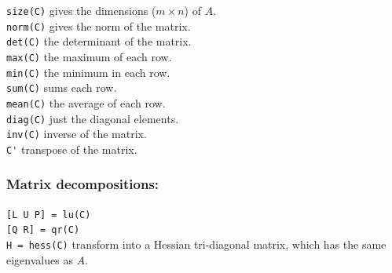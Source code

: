 \verb&size(C)& \dotfill gives the dimensions ($m \times n$) of $A$.\\
\verb&norm(C)& \dotfill gives the norm of the matrix.\\
\verb&det(C)&   \dotfill the determinant of the matrix.\\
\verb&max(C)&   \dotfill the maximum of each row.\\
\verb&min(C)&   \dotfill the minimum in each row.\\
\verb&sum(C)&   \dotfill sums each row.\\
\verb&mean(C)&   \dotfill the average of each row.\\
\verb&diag(C)&   \dotfill just the diagonal elements. \\
\verb&inv(C)&    \dotfill inverse of the matrix.\\
\verb&C'&    \dotfill transpose of the matrix.

\subsubsection*{Matrix decompositions:}

\verb&[L U P] = lu(C)&\\
\verb&[Q R] = qr(C)&\\
\verb&H = hess(C)& \dotfill transform into a Hessian tri-diagonal matrix, which has the same eigenvalues as $A$.





